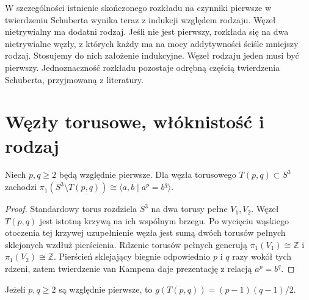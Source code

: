 W szczególności istnienie skończonego rozkładu na czynniki
pierwsze w twierdzeniu Schuberta wynika teraz z indukcji
względem rodzaju. Węzeł nietrywialny ma dodatni rodzaj.
Jeśli nie jest pierwszy, rozkłada się na dwa nietrywialne
węzły, z których każdy ma na mocy addytywności
ściśle mniejszy rodzaj. Stosujemy do nich założenie
indukcyjne. Węzeł rodzaju jeden musi być pierwszy.
Jednoznaczność rozkładu pozostaje odrębną częścią
twierdzenia Schuberta, przyjmowaną z literatury.

\section{Węzły torusowe, włóknistość i rodzaj}
\label{sec:kt-torusowe}

\begin{twierdzenie}
Niech $p,q\geq2$ będą względnie pierwsze. Dla węzła torusowego
$T(p,q)\subset S^3$ zachodzi
$\pi_1(S^3\setminus T(p,q))\cong
\langle a,b\mid a^p=b^q\rangle$.
\end{twierdzenie}

\begin{proof}
Standardowy torus rozdziela $S^3$ na dwa torusy pełne
$V_1,V_2$. Węzeł $T(p,q)$ jest istotną krzywą na ich wspólnym
brzegu. Po wycięciu wąskiego otoczenia tej krzywej
uzupełnienie węzła jest sumą dwóch torusów pełnych sklejonych
wzdłuż pierścienia. Rdzenie torusów pełnych generują
$\pi_1(V_1)\cong\mathbb Z$ i $\pi_1(V_2)\cong\mathbb Z$.
Pierścień sklejający biegnie odpowiednio $p$ i $q$ razy
wokół tych rdzeni, zatem twierdzenie van Kampena daje
prezentację z relacją $a^p=b^q$.
\end{proof}

\begin{twierdzenie}
Jeżeli $p,q\geq2$ są względnie pierwsze, to
$g(T(p,q))=(p-1)(q-1)/2$.
\end{twierdzenie}


